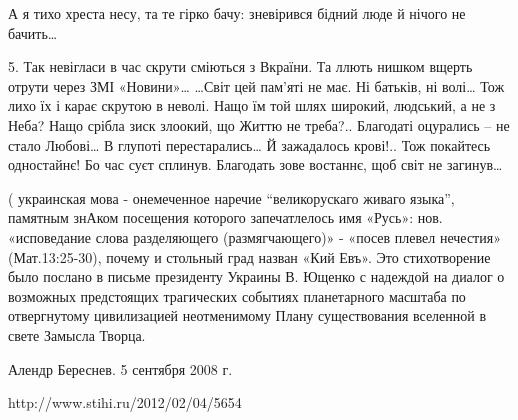 А я тихо хреста несу,
та те гірко бачу:
зневірився бідний люде
й нічого не бачить…

   5.
Так невігласи в час скрути
сміються з Вкраїни.
Та ллють нишком вщерть отрути
через ЗМІ  «Новини»…
              …Світ цей пам’яті не має.
              Ні батьків, ні волі…
              Тож лихо їх і карає
               скрутою в неволі.
Нащо їм той шлях широкий,
людський, а не з Неба?
Нащо срібла зиск злоокий,
що Життю не треба?..
               Благодаті оцурались –
               не стало Любові…
               В глупоті перестарались…
               Й зажадалось крові!..
Тож покайтесь одностайнє!
Бо час суєт сплинув.
Благодать зове востаннє,
щоб світ не загинув…
    
              ( украинская   мова  -  онемеченное  наречие  “великорускаго  живаго  языка”, памятным знАком   
     посещения которого запечатлелось имя «Русь»: нов. «исповедание слова разделяющего 
    (размягчающего)» - «посев плевел нечестия» (Мат.13:25-30), почему и стольный град назван «Кий Евъ».
              Это стихотворение было послано в письме президенту Украины В. Ющенко с надеждой на диалог о возможных предстоящих трагических событиях планетарного масштаба по отвергнутому цивилизацией неотменимому Плану существования вселенной в свете Замысла Творца.


         Алендр Береснев.
             5  сентября  2008 г.

         http://www.stihi.ru/2012/02/04/5654
